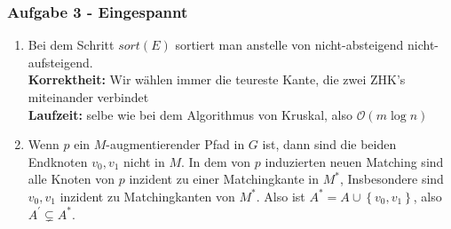 \documentclass[11pt]{scrartcl}
\newcommand{\task}[1]{\subsubsection*{#1}}
\begin{document}
\task{Aufgabe 3 - Eingespannt}
\begin{enumerate}[label=\alph*)]
	\item Bei dem Schritt $ sort(E) $ sortiert man anstelle von nicht-absteigend nicht-aufsteigend.\\
		\textbf{Korrektheit:} Wir wählen immer die teureste Kante, die zwei ZHK's miteinander verbindet\\
		\textbf{Laufzeit:} selbe wie bei dem Algorithmus von Kruskal, also $ \mathcal{O} \left( m \log n \right)  $
	\item 
		Wenn $ p $ ein $ M $-augmentierender Pfad in $ G $ ist, dann sind die beiden Endknoten $ v_0, v_1 $ nicht in $ M $.
		In dem von $ p $ induzierten neuen Matching sind alle Knoten von $ p $ inzident zu einer Matchingkante in $ M^* $,
		Insbesondere sind $ v_0, v_1 $ inzident zu Matchingkanten von $ M^* $.
		Also ist $ A^* = A \cup \left\{ v_0, v_1 \right\}  $, also $ A^\prime  \subsetneq A^*  $.
\end{enumerate}
\end{document}
